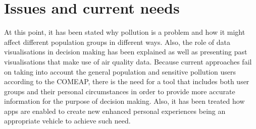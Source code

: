 \section{Issues and current needs}
At this point, it has been stated why pollution is a problem and how it might affect different population groups in different ways. Also, the role of data visualisations in decision making has been explained as well as presenting past visualisations that make use of air quality data. Because current approaches fail on taking into account the general population and sensitive pollution users according to the COMEAP, there is the need for a tool that includes both user groups and their personal circumstances in order to provide more accurate information for the purpose of decision making.  Also, it has been treated how apps are enabled to create new enhanced personal experiences being an appropriate vehicle to achieve such need.